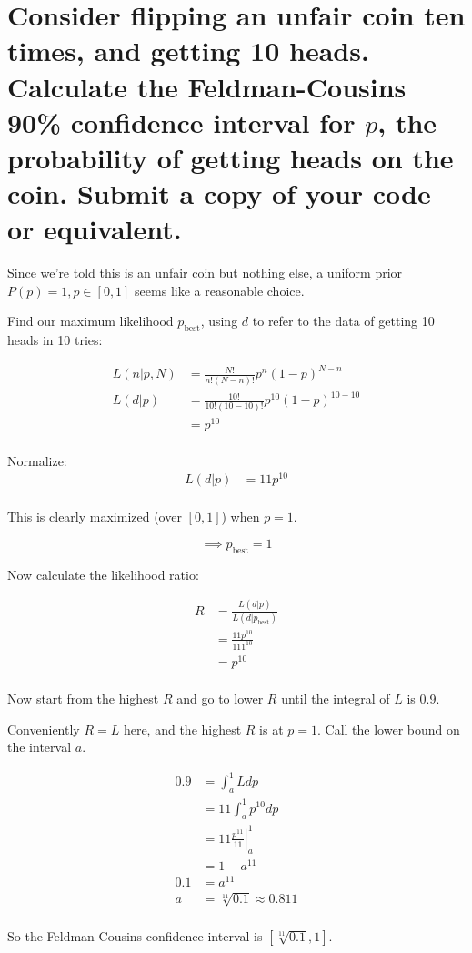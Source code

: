 \section{Consider flipping an unfair coin ten times, and getting 10 heads. Calculate the Feldman-Cousins 90\% confidence interval for \texorpdfstring{$p$}{p}, the probability of getting heads on the coin. Submit a copy of your code or equivalent.}

Since we're told this is an unfair coin but nothing else, a uniform prior $P(p)=1, p \in [0,1]$ seems like a reasonable choice.

Find our maximum likelihood $p_{\text{best}}$, using $d$ to refer to the data of getting 10 heads in 10 tries:

\begin{align*}
    L(n|p, N) &= \frac{N!}{n!(N-n)!} p^{n}(1-p)^{N-n} \\
    L(d|p) &= \frac{10!}{10!(10-10)!} p^{10}(1-p)^{10-10} \\
    &= p^{10} \\
\end{align*}

Normalize:
\begin{align*}
    L(d|p) &= 11p^{10} \\
\end{align*}


This is clearly maximized (over $[0,1]$) when $p=1$.

$$\implies p_{\text{best}} = 1$$

Now calculate the likelihood ratio:

\begin{align*}
    R &= \frac{L(d|p)}{L(d|p_{\text{best}})} \\
    &= \frac{11p^{10}}{111^{10}} \\
    &= p^{10} \\
\end{align*}

Now start from the highest $R$ and go to lower $R$ until the integral of $L$ is 0.9.

Conveniently $R=L$ here, and the highest $R$ is at $p=1$. Call the lower bound on the interval $a$.

\begin{align*}
    0.9 &= \int_a^1 L dp \\
    &= 11\int_a^1 p^{10} dp \\
    &= 11\left.\frac{p^{11}}{11}\right|_a^1 \\
    &= 1 - a^{11} \\
    0.1 &= a^{11} \\
    a &= \sqrt[11]{0.1} \approx 0.811 \\
\end{align*}

So the Feldman-Cousins confidence interval is $[\sqrt[11]{0.1}, 1]$.
